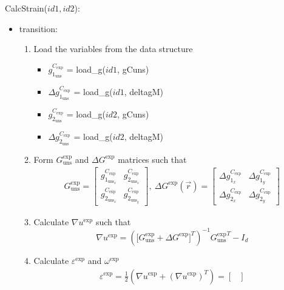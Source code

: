 \documentclass[12pt, titlepage]{article}
\begin{document}
\noindent CalcStrain($id1,id2$):
\begin{itemize}
\item transition:
\begin{enumerate}
\item Load the variables from the data structure 
	\begin{itemize}
	\item $g_{1_{{\text{uns}}}}^{C_{\text{exp}}}$ = load{\_}g($id1$, gCuns)
	\item $\Delta g_{1_{{\text{uns}}}}^{C_{\text{exp}}}$ = load{\_}g($id1$, 
deltagM)
	\item $g_{2_{{\text{uns}}}}^{C_{\text{exp}}}$ = load{\_}g($id2$, gCuns)
	\item $\Delta g_{2_{{\text{uns}}}}^{C_{\text{exp}}}$ = load{\_}g($id2$, 
deltagM)
	\end{itemize}
\item Form ${{G_{\text{uns}}^{\text{exp}}}}$ and $\Delta G^{\text{exp}}$ 
matrices such that
\begin{equation*}
\begin{gathered}
G_{\text{uns}}^{\text{exp}} =
	\begin{bmatrix}
	g_{1_{{\text{uns}}_x}}^{C_{\text{exp}}} & 
g_{2_{{\text{uns}}_x}}^{C_{\text{exp}}} \\
	g_{2_{{\text{uns}}_x}}^{C_{\text{exp}}} & 
g_{2_{{\text{uns}}_y}}^{C_{\text{exp}}} 
	\end{bmatrix}, \ 
\Delta G^{\text{exp}}(\vec{r})=
	\begin{bmatrix}
	\Delta g_{1_{x}}^{C_{\text{exp}}} & \Delta g_{1_{y}}^{C_{\text{exp}}}\\
	\Delta g_{2_{x}}^{C_{\text{exp}}} & \Delta g_{2_{y}}^{C_{\text{exp}}}
	\end{bmatrix}
\end{gathered}
\end{equation*}
\item Calculate $\nabla u^{\text{exp}}$ such that
\begin{equation*}
\nabla u^{\text{exp}} = ({[{G_{\text{uns}}^{\text{exp}}}+\Delta 
G^{\text{exp}}}]^{T})^{-1}{{G_{\text{uns}}^{\text{exp}}}}^{T}-I_{d}
\end{equation*}
\item Calculate $\varepsilon^{\text{exp}}$ and $\omega^{\text{exp}}$
\begin{equation*}
\begin{gathered}
\varepsilon^{\text{exp}} = \frac{1}{2}(\nabla u^{\text{exp}}+(\nabla 
u^{\text{exp}})^{T})= \begin{bmatrix}

\end{bmatrix}
\end{gathered}
\end{equation*}
\end{enumerate}
\end{itemize}
\end{document}
